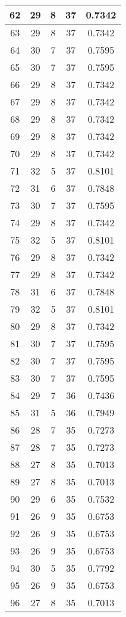 \documentclass[letterpaper, 12pt]{article}
\begin{document}
\begin{longtable}{|c|c|c|c|c|}
\hline
62 & 29 & 8 & 37 & 0.7342 \\
\hline
63 & 29 & 8 & 37 & 0.7342 \\
\hline
64 & 30 & 7 & 37 & 0.7595 \\
\hline
65 & 30 & 7 & 37 & 0.7595 \\
\hline
66 & 29 & 8 & 37 & 0.7342 \\
\hline
67 & 29 & 8 & 37 & 0.7342 \\
\hline
68 & 29 & 8 & 37 & 0.7342 \\
\hline
69 & 29 & 8 & 37 & 0.7342 \\
\hline
70 & 29 & 8 & 37 & 0.7342 \\
\hline
71 & 32 & 5 & 37 & 0.8101 \\
\hline
72 & 31 & 6 & 37 & 0.7848 \\
\hline
73 & 30 & 7 & 37 & 0.7595 \\
\hline
74 & 29 & 8 & 37 & 0.7342 \\
\hline
75 & 32 & 5 & 37 & 0.8101 \\
\hline
76 & 29 & 8 & 37 & 0.7342 \\
\hline
77 & 29 & 8 & 37 & 0.7342 \\
\hline
78 & 31 & 6 & 37 & 0.7848 \\
\hline
79 & 32 & 5 & 37 & 0.8101 \\
\hline
80 & 29 & 8 & 37 & 0.7342 \\
\hline
81 & 30 & 7 & 37 & 0.7595 \\
\hline
82 & 30 & 7 & 37 & 0.7595 \\
\hline
83 & 30 & 7 & 37 & 0.7595 \\
\hline
84 & 29 & 7 & 36 & 0.7436 \\
\hline
85 & 31 & 5 & 36 & 0.7949 \\
\hline
86 & 28 & 7 & 35 & 0.7273 \\
\hline
87 & 28 & 7 & 35 & 0.7273 \\
\hline
88 & 27 & 8 & 35 & 0.7013 \\
\hline
89 & 27 & 8 & 35 & 0.7013 \\
\hline
90 & 29 & 6 & 35 & 0.7532 \\
\hline
91 & 26 & 9 & 35 & 0.6753 \\
\hline
92 & 26 & 9 & 35 & 0.6753 \\
\hline
93 & 26 & 9 & 35 & 0.6753 \\
\hline
94 & 30 & 5 & 35 & 0.7792 \\
\hline
95 & 26 & 9 & 35 & 0.6753 \\
\hline
96 & 27 & 8 & 35 & 0.7013 \\

\end{longtable}
\end{document}
